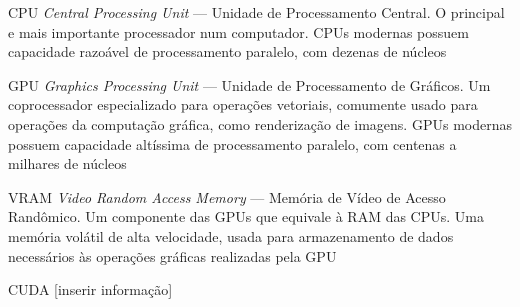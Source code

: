 \documentclass[12pt,
openright, 
oneside, %
a4paper,    %
brazil]{facom-ufu-abntex2}
\begin{document}

\listoffigures*
\cleardoublepage




\listoftables*
\cleardoublepage




\begin{siglas}
  \item[CPU] \textit{Central Processing Unit} --- Unidade de Processamento Central. O principal e mais importante processador num computador. CPUs modernas possuem capacidade razoável de processamento paralelo, com dezenas de núcleos
  \item[GPU] \textit{Graphics Processing Unit} --- Unidade de Processamento de Gráficos. Um coprocessador especializado para operações vetoriais, comumente usado para operações da computação gráfica, como renderização de imagens. GPUs modernas possuem capacidade altíssima de processamento paralelo, com centenas a milhares de núcleos
  \item[VRAM] \textit{Video Random Access Memory} --- Memória de Vídeo de Acesso Randômico. Um componente das GPUs que equivale à RAM das CPUs. Uma memória volátil de alta velocidade, usada para armazenamento de dados necessários às operações gráficas realizadas pela GPU
  \item[CUDA] [inserir informação]
\end{siglas}




\end{document}

